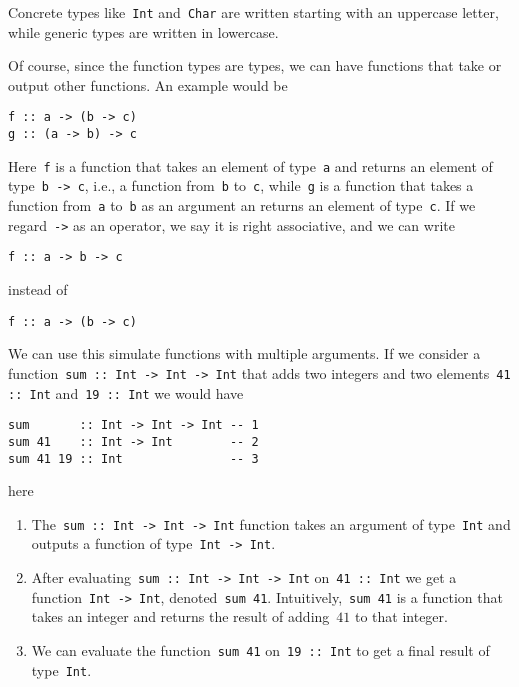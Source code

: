 \documentclass[a4paper]{article}
\theoremstyle{plain}
\theoremstyle{definition}
\newcommand{\ie}{{i}.{e}., }
\begin{document}
Concrete types like~\texttt{Int} and~\texttt{Char} are
written starting with an uppercase letter, while generic types are written in
lowercase.

Of course, since the function types are types, we can have functions that take
or output other functions. An example would be
\begin{verbatim}
f :: a -> (b -> c)
g :: (a -> b) -> c
\end{verbatim}
Here~\texttt{f} is a function that takes an element of
type~\texttt{a} and returns an element of
type~\texttt{b -> c}, \ie a function from~\texttt{b}
to~\texttt{c}, while~\texttt{g} is a function that
takes a function from~\texttt{a} to~\texttt{b} as an
argument an returns an element of type~\texttt{c}. If we
regard~\texttt{->} as an operator, we say it is right associative,
and we can write
\begin{verbatim}
f :: a -> b -> c
\end{verbatim}
instead of
\begin{verbatim}
f :: a -> (b -> c)
\end{verbatim}

We can use this simulate functions with multiple arguments.
If we consider a function~\texttt{sum :: Int -> Int -> Int} that
adds two integers and two elements~\texttt{41 :: Int}
and~\texttt{19 :: Int} we would have
\begin{verbatim}
sum       :: Int -> Int -> Int -- 1
sum 41    :: Int -> Int        -- 2
sum 41 19 :: Int               -- 3
\end{verbatim}
here
\begin{enumerate}
    \item The~\texttt{sum :: Int -> Int -> Int} function takes an
        argument of type~\texttt{Int} and outputs a function of
        type~\texttt{Int -> Int}.
    \item After evaluating~\texttt{sum :: Int -> Int -> Int}
        on~\texttt{41 :: Int} we get a
        function~\texttt{Int -> Int},
        denoted~\texttt{sum 41}.
        Intuitively,~\texttt{sum 41} is a function that takes an
        integer and returns the result of adding~\(41\) to that integer.
    \item We can evaluate the function~\texttt{sum 41}
        on~\texttt{19 :: Int} to get a final result of
        type~\texttt{Int}.
\end{enumerate}
\end{document}
